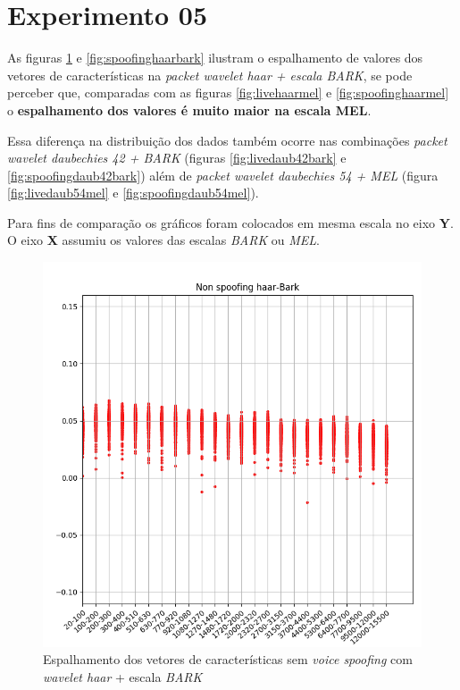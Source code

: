 	\section{Experimento 05}
	\label{chap:testsResults:sec:Experimento05}
		As figuras \ref{fig:livehaarbark} e \ref{fig:spoofinghaarbark} ilustram o espalhamento de valores dos vetores de características na \textit{packet wavelet haar + escala BARK}, se pode perceber que, comparadas com as figuras \ref{fig:livehaarmel} e \ref{fig:spoofinghaarmel} o \textbf{espalhamento dos valores é muito maior na escala \textbf{MEL}}.
		\par Essa diferença na distribuição dos dados também ocorre nas combinações \textit{packet wavelet daubechies 42 + BARK} (figuras \ref{fig:livedaub42bark} e \ref{fig:spoofingdaub42bark}) além de \textit{packet wavelet daubechies 54 + MEL} (figura \ref{fig:livedaub54mel} e \ref{fig:spoofingdaub54mel}).
		\par Para fins de comparação os gráficos foram colocados em mesma escala no eixo \textbf{Y}. O eixo \textbf{X} assumiu os valores das escalas \textit{BARK} ou \textit{MEL}.
		\begin{figure}[h]
			\centering
			\includegraphics[width=\linewidth]{images/results/barkVersusMel/liveHaarBark}
			\caption{Espalhamento dos vetores de características sem \textit{voice spoofing} com \textit{wavelet haar} + escala \textit{BARK} }
			\label{fig:livehaarbark}
		\end{figure}
	
